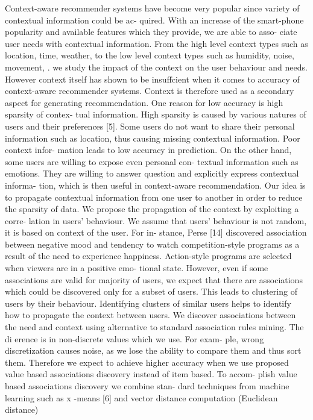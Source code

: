 \documentclass[a4paper,8pt]{article}
\begin{document}
\begin{multicols}{2}
Context-aware  recommender  systems  have  become  very
popular since variety of contextual information could be ac-
quired.  With an increase of the smart-phone popularity and
available features which they provide, we are able to asso-
ciate user needs with contextual information.  From the high
level context types such as location,  time,  weather,  to the
low level context types such as humidity, noise, movement,
.
we study the impact of the context on the user behaviour and
needs.  However context itself has shown to be insuffcient
when  it  comes  to  accuracy  of  context-aware  recommender
systems.  Context is therefore used as a secondary aspect for
generating recommendation.
One  reason  for  low  accuracy  is  high  sparsity  of  contex-
tual information.  High sparsity is caused by various natures
of users and their preferences [5].  Some users do not want
to  share  their  personal  information  such  as  location,  thus
causing missing contextual information.  Poor context infor-
mation  leads  to  low  accuracy  in  prediction.   On  the  other
hand,  some users are willing to expose even personal con-
textual information such as emotions.  They are willing to
answer question and explicitly express contextual informa-
tion, which is then useful in context-aware recommendation.
Our idea is to propagate contextual information from one
user to another in order to reduce the sparsity of data.  We
propose the propagation of the context by exploiting a corre-
lation in users' behaviour.  We assume that users' behaviour
is not random,  it is based on context of the user.  For in-
stance,  Perse  [14]  discovered  association  between  negative
mood and tendency to watch competition-style programs as
a result of the need to experience happiness.   Action-style
programs are selected when viewers are in a positive emo-
tional  state.   However,  even  if  some  associations  are  valid
for majority of users, we expect that there are associations
which could be discovered only for a subset of users.  This
leads to clustering of users by their behaviour.  Identifying
clusters of similar users helps to identify how to propagate
the context between users.
We  discover  associations  between  the  need  and  context
using alternative to standard association rules mining.  The
di erence is in non-discrete values which we use.  For exam-
ple, wrong discretization causes noise, as we lose the ability
to compare them and thus sort them. Therefore we expect to
achieve higher accuracy when we use proposed value based
associations  discovery  instead  of  item  based.   To  accom-
plish  value  based  associations  discovery  we  combine  stan-
dard techniques from machine learning such as
x
-means [6]
and vector distance computation (Euclidean distance)


\end{multicols}
\end{document}

